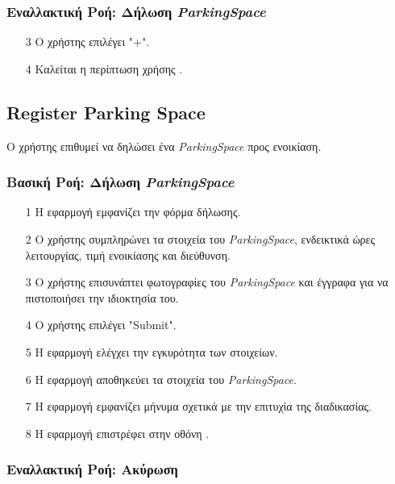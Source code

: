 \subsubsection{Εναλλακτική Ροή: Δήλωση \textit{ParkingSpace}}

\begin{enumerate}
    \item[3] Ο χρήστης επιλέγει "+".
    \item[4] Καλείται η περίπτωση χρήσης .
\end{enumerate}

\newpage

\subsection{Register Parking Space}
\label{uc:register-parking-space}

Ο χρήστης επιθυμεί να δηλώσει ένα \textit{ParkingSpace} προς ενοικίαση.

\subsubsection{Βασική Ροή: Δήλωση \textit{ParkingSpace}}

\begin{enumerate}
    \item[1] Η εφαρμογή εμφανίζει την φόρμα δήλωσης.
    \item[2] Ο χρήστης συμπληρώνει τα στοιχεία του \textit{ParkingSpace},
        ενδεικτικά ώρες λειτουργίας, τιμή ενοικίασης και διεύθυνση.
    \item[3] Ο χρήστης επισυνάπτει φωτογραφίες του \textit{ParkingSpace} και έγγραφα
        για να πιστοποιήσει την ιδιοκτησία του.
    \item[4] Ο χρήστης επιλέγει "Submit".
    \item[5] Η εφαρμογή ελέγχει την εγκυρότητα των στοιχείων.
    \item[6] Η εφαρμογή αποθηκεύει τα στοιχεία του \textit{ParkingSpace}.
    \item[7] Η εφαρμογή εμφανίζει μήνυμα σχετικά με την επιτυχία της διαδικασίας.
    \item[8] Η εφαρμογή επιστρέφει στην οθόνη .
\end{enumerate}

\subsubsection{Εναλλακτική Ροή: Ακύρωση}

